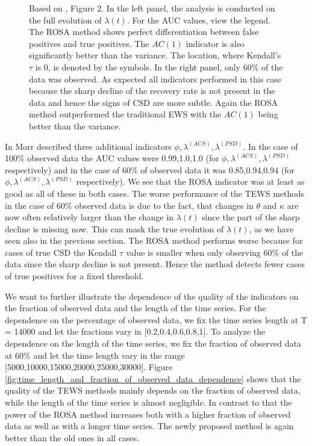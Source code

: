 \documentclass[%
thesis=student,%
coverpage=false,%
titlepage=false,%
headmarks=true, %
english,%
font=libertine, %
math=newpxtx, %
BCOR=5mm,%
coverBCOR=11mm%
]{tumbook}
\begin{document}
\begin{figure}[h!]
    \caption{Based on \cite{Morr:2024}, Figure 2. In the left panel, the analysis is conducted on the full evolution of $\lambda(t)$. For the AUC values, view the legend. The ROSA method shows perfect differentiation between false positives and true positives. The $AC(1)$ indicator is also significantly better than the variance. The location, where Kendall's $\tau$ is 0, is denoted by the symbols. In the right panel, only 60\% of the data was observed. As expected all indicators performed in this case because the sharp decline of the recovery rate is not present in the data and hence the signs of CSD are more subtle. Again the ROSA method outperformed the traditional EWS with the $AC(1)$ being better than the variance.}
    \label{fig:ROC_curves}
\end{figure}
 

In \cite{Morr:2024} Morr described three additional indicators $\phi,\lambda^{(ACS)},\lambda^{(PSD)}$. In the case of 100\% observed data the AUC values were 0.99,1.0,1.0 (for $\phi,\lambda^{(ACS)},\lambda^{(PSD)}$ respectively) and in the case of 60\% of observed data it was 0.85,0.94,0.94 (for $\phi,\lambda^{(ACS)},\lambda^{(PSD)}$ respectively). We see that the ROSA indicator was at least as good as all of these in both cases.
The worse performance of the TEWS methods in the case of 60\% observed data is due to the fact, that changes in $\theta$ and $\kappa$ are now often relatively larger than the change in $\lambda(t)$ since the part of the sharp decline is missing now. This can mask the true evolution of $\lambda(t)$, as we have seen also in the previous section. The ROSA method performs worse because for cases of true CSD the Kendall $\tau$ value is smaller when only observing 60\% of the data since the sharp decline is not present. Hence the method detects fewer cases of true positives for a fixed threshold.

We want to further illustrate the dependence of the quality of the indicators on the fraction of observed data and the length of the time series. For the dependence on the percentage of observed data, we fix the time series length at T = 14000 and let the fractions vary in [0.2,0.4,0.6,0.8,1]. To analyze the dependence on the length of the time series, we fix the fraction of observed data at 60\% and let the time length vary in the range [5000,10000,15000,20000,25000,30000]. Figure \ref{fig:time_length_and_fraction_of_observed_data_dependence} shows that the quality of the TEWS methods mainly depends on the fraction of observed data, while the length of the time series is almost negligible. In contrast to that the power of the ROSA method increases both with a higher fraction of observed data as well as with a longer time series. The newly proposed method is again better than the old ones in all cases. 
\end{document}
